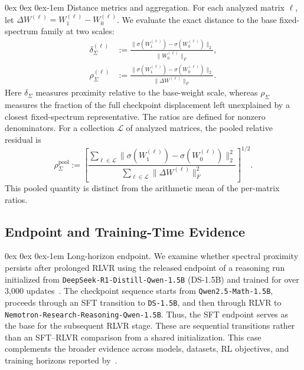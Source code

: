 \documentclass[11pt, a4paper]{utda}
\makeatletter
\renewcommand{\paragraph}{%
  \@startsection{paragraph}{4}%
  {\z@}{0ex \@plus 0ex \@minus 0ex}{-1em}%
  {\normalfont\normalsize\bfseries}%
}
\theoremstyle{plain}
\theoremstyle{definition}
\theoremstyle{remark}
\makeatother
\begin{document}
\paragraph{Distance metrics and aggregation.}
For each analyzed matrix $\ell$, let
$\Delta W^{(\ell)}=W_1^{(\ell)}-W_0^{(\ell)}$.
We evaluate the exact distance to the base fixed-spectrum family
at two scales:
\begin{equation}
\label{eq:app-spectrum_distance_metrics}
\begin{aligned}
    \delta_{\Sigma}^{(\ell)}
    &:=
    \frac{
        \|\sigma(W_1^{(\ell)})-\sigma(W_0^{(\ell)})\|_2
    }{
        \|W_0^{(\ell)}\|_F
    },
    \\
    \rho_{\Sigma}^{(\ell)}
    &:=
    \frac{
        \|\sigma(W_1^{(\ell)})-\sigma(W_0^{(\ell)})\|_2
    }{
        \|\Delta W^{(\ell)}\|_F
    }.
\end{aligned}
\end{equation}
Here $\delta_\Sigma$ measures proximity relative to the base-weight
scale, whereas $\rho_\Sigma$ measures the fraction of the full
checkpoint displacement left unexplained by a closest
fixed-spectrum representative.
The ratios are defined for nonzero denominators.
For a collection $\mathcal L$ of analyzed matrices, the pooled
relative residual is
\begin{equation}
\label{eq:pooled_spectrum_residual}
    \rho_{\Sigma}^{\mathrm{pool}}
    :=
    \left[
        \frac{
            \sum_{\ell\in\mathcal L}
            \|\sigma(W_1^{(\ell)})-\sigma(W_0^{(\ell)})\|_2^2
        }{
            \sum_{\ell\in\mathcal L}
            \|\Delta W^{(\ell)}\|_F^2
        }
    \right]^{1/2}.
\end{equation}
This pooled quantity is distinct from the arithmetic mean
of the per-matrix ratios.


\subsection{Endpoint and Training-Time Evidence}
\label{app:spectral_evidence}

\paragraph{Long-horizon endpoint.}
We examine whether spectral proximity persists after prolonged
RLVR using the released endpoint of a reasoning run initialized
from \texttt{DeepSeek-R1-Distill-Qwen-1.5B} (DS-1.5B) and trained
for over 3,000 updates~\cite{liu2025prorl,hu2025brorl}.
The checkpoint sequence starts from
\nolinkurl{Qwen2.5-Math-1.5B}, proceeds through an SFT transition to
\texttt{DS-1.5B}, and then through RLVR to
\nolinkurl{Nemotron-Research-Reasoning-Qwen-1.5B}.
Thus, the SFT endpoint serves as the base for the subsequent
RLVR stage.
These are sequential transitions rather than an SFT--RLVR
comparison from a shared initialization.
This case complements the broader evidence across models,
datasets, RL objectives, and training horizons reported
by~\cite{zhu2025path}.
\end{document}
